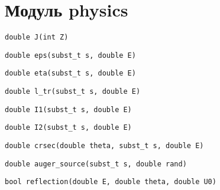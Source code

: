 \section{Модуль physics}

\begin{verbatim}
double J(int Z)
\end{verbatim}

\begin{verbatim}
double eps(subst_t s, double E)
\end{verbatim}

\begin{verbatim}
double eta(subst_t s, double E)
\end{verbatim}

\begin{verbatim}
double l_tr(subst_t s, double E)
\end{verbatim}

\begin{verbatim}
double I1(subst_t s, double E)
\end{verbatim}

\begin{verbatim}
double I2(subst_t s, double E)
\end{verbatim}

\begin{verbatim}
double crsec(double theta, subst_t s, double E)
\end{verbatim}

\begin{verbatim}
double auger_source(subst_t s, double rand)
\end{verbatim}

\begin{verbatim}
bool reflection(double E, double theta, double U0)
\end{verbatim}